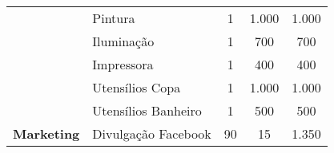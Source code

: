 \begin{table}[h]
{\begin{tabular}{clccc}
		\multicolumn{1}{|c|}{}                                                                                                      & \multicolumn{1}{l|}{Pintura}                  & \multicolumn{1}{c|}{1}                   & \multicolumn{1}{c|}{1.000}                                                                   & \multicolumn{1}{c|}{1.000}                                                                \\ \cline{2-5} 
		\multicolumn{1}{|c|}{}                                                                                                      & \multicolumn{1}{l|}{Iluminação}               & \multicolumn{1}{c|}{1}                   & \multicolumn{1}{c|}{700}                                                                     & \multicolumn{1}{c|}{700}                                                                  \\ \cline{2-5} 
		\multicolumn{1}{|c|}{}                                                                                                      & \multicolumn{1}{l|}{Impressora}               & \multicolumn{1}{c|}{1}                   & \multicolumn{1}{c|}{400}                                                                     & \multicolumn{1}{c|}{400}                                                                  \\ \cline{2-5} 
		\multicolumn{1}{|c|}{}                                                                                                      & \multicolumn{1}{l|}{Utensílios Copa}          & \multicolumn{1}{c|}{1}                   & \multicolumn{1}{c|}{1.000}                                                                   & \multicolumn{1}{c|}{1.000}                                                                \\ \cline{2-5} 
		\multicolumn{1}{|c|}{}                                                                                                      & \multicolumn{1}{l|}{Utensílios Banheiro}      & \multicolumn{1}{c|}{1}                   & \multicolumn{1}{c|}{500}                                                                     & \multicolumn{1}{c|}{500}                                                                  \\ \hline
		\multicolumn{1}{|c|}{\multirow{4}{*}{\textbf{Marketing}}}                                                                   & \multicolumn{1}{l|}{Divulgação Facebook}      & \multicolumn{1}{c|}{90}                  & \multicolumn{1}{c|}{15}                                                                      & \multicolumn{1}{c|}{1.350}                                                                \\ \cline{2-5} 

\end{tabular}}
\end{table}
